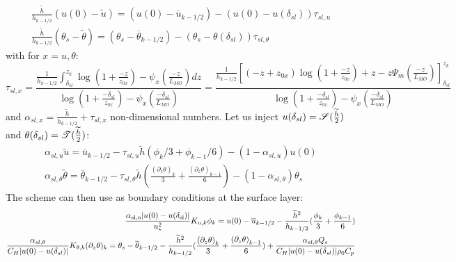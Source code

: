 \begin{equation} \label{eq:ND_Ocean_tmprelation_tilde_bar}
\begin{aligned}
	\frac{\widetilde{h}}{h_{k-1/2}} (u(0) - \widetilde{u}) =
	(u(0) - \overline{u}_{k-1/2}) -
	(u(0) - u(\delta_{sl}))\tau_{sl, u} \\
\frac{\widetilde{h}}{h_{k-1/2}} (\theta_s - \widetilde{\theta}) =
	(\theta_s - \overline{\theta}_{k-1/2}) -
	(\theta_s - \theta(\delta_{sl}))\tau_{sl, \theta}
\end{aligned}
\end{equation}
with for $x = u, \theta$:
\begin{equation}
	\tau_{sl, x} = \frac{\frac{1}{{h_{k-1/2}}}\int_{\delta_{sl}}^{z_k} \log(1+\frac{-z}{z_{0x}})- \psi_x(\frac{-z}{L_{MO}})
	dz}{\log(1+\frac{-\delta_{sl}}{z_{0x}})- \psi_x(\frac{-\delta_{sl}}{L_{MO}})
    }
    =
 \frac{\frac{1}{{h_{k-1/2}}}
    \left[
	    (-z+z_{0x})\log(1+\frac{-z}{z_{0x}})+z
    -
    z \Psi_m(\frac{-z}{L_{MO}}) \right]_{\delta_{sl}}^{z_k}
    }{\log(1+\frac{-\delta_{sl}}{z_{0x}})- \psi_x(\frac{-\delta_{sl}}{L_{MO}})
    }
\end{equation}
and
$\alpha_{sl, x} = \frac{\widetilde{h}}{h_{k-1/2}} +
\tau_{sl, x}$
non-dimensional numbers.
Let us inject $u(\delta_{sl}) =
{\cal S}(\frac{\widetilde{h}}{2})$ and
$\theta(\delta_{sl}) = {\cal T}(\frac{\widetilde{h}}{2})$:
\begin{equation}
\begin{aligned}
\label{eq:ND_Ocean_relation_tilde_bar}
\alpha_{sl, u}\widetilde{u} = \overline{u}_{k-1/2} -
	\tau_{sl, u}
\widetilde{h}
	(\phi_k/3 + \phi_{k-1}/6) - (1 - \alpha_{sl, u})u(0)\\
\alpha_{sl, \theta}
\widetilde{\theta}
= \overline{\theta}_{k-1/2} - \tau_{sl, \theta}
	\widetilde{h}(\frac{{(\partial_z \theta)}_k}{3} + \frac{{(\partial_z \theta)}_{k-1}}{6})
 - (1 - \alpha_{sl, \theta})\theta_s
\end{aligned}
\end{equation}
The scheme can then use as boundary conditions at the surface layer:
\begin{equation}
\label{eq:ND_Ocean_boundaryConditionFVfree}
\begin{aligned}
	\frac{\alpha_{\rm sl, u} |u(0) - u(\delta_{\rm sl})|}
	{u_\star^2}K_{u,k} \phi_k =
	u(0) - \overline{u}_{k-1/2} - \frac{\widetilde{h}^2}{h_{k-1/2}}
	(\frac{\phi_k}{3} + \frac{\phi_{k-1}}{6})
	\\
  \frac{\alpha_{sl, \theta} }
	{C_H |u(0)-u(\delta_{sl})|}
	K_{\theta, k} (\partial_z \theta)_k = 
  \theta_s - \overline{\theta}_{k-1/2} - \frac{\widetilde{h}^2}{h_{k-1/2}}
	(\frac{{(\partial_z \theta)}_k}{3} +
	\frac{{(\partial_z \theta)}_{k-1}}{6}) 
	+ \frac{\alpha_{sl, \theta} Q_s }
	{C_H |u(0)-u(\delta_{sl})| \rho_0 C_p}
  \\
\end{aligned}
\end{equation}

